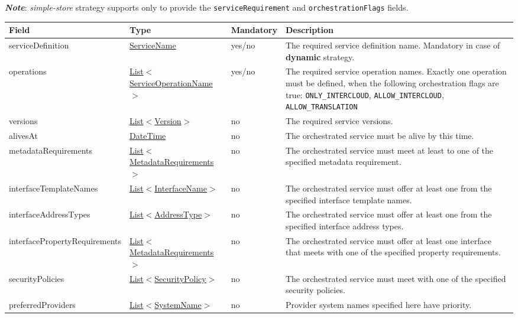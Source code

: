 \documentclass[a4paper]{arrowhead}
\newcommand{\pref}[1]{{\textcolor{ArrowheadGrey}{\hyperref[sec:model:primitives:#1]{#1}}}}
\begin{document}
\textbf{\textit{Note}}: \textit{simple-store} strategy supports only to provide the \texttt{serviceRequirement} and \texttt{orchestrationFlags} fields. 

\clearpage


\begin{table}[ht!]
\begin{tabularx}{\textwidth}{| p{4.8cm} | p{4.7cm} | p{2cm} | X |} \hline
\rowcolor{gray!33} Field & Type & Mandatory & Description \\ \hline
serviceDefinition & \pref{ServiceName} & yes/no & The required service definition name. Mandatory in case of \textbf{dynamic} strategy. \\ \hline
operations & \pref{List}$<$\pref{ServiceOperationName}$>$ & yes/no & The required service operation names. \newline 
Exactly one operation must be defined, when the following orchestration flags are true: \newline \texttt{ONLY\_INTERCLOUD}, \texttt{ALLOW\_INTERCLOUD}, \texttt{ALLOW\_TRANSLATION} \\ \hline
versions & \pref{List}$<$\pref{Version}$>$ & no & The required service versions. \\ \hline 
alivesAt & \pref{DateTime} & no & The orchestrated service must be alive by this time. \\ \hline
metadataRequirements & \pref{List}$<$\hyperref[sec:model:MetadataRequirements]{MetadataRequirements}$>$ & no & The orchestrated service must meet at least to one of the specified metadata requirement. \\ \hline
interfaceTemplateNames & \pref{List}$<$\pref{InterfaceName}$>$ & no & The orchestrated service must offer at least one from the specified interface template names. \\ \hline 
interfaceAddressTypes & \pref{List}$<$\pref{AddressType}$>$ & no & The orchestrated service must offer at least one from the specified interface address types. \\ \hline
interfacePropertyRequirements & \pref{List}$<$\hyperref[sec:model:MetadataRequirements]{MetadataRequirements}$>$ & no & The orchestrated service must offer at least one interface that meets with one of the specified property requirements. \\ \hline
securityPolicies & \pref{List}$<$\pref{SecurityPolicy}$>$ & no & The orchestrated service must meet with one of the specified security policies. \\ \hline
preferredProviders & \pref{List}$<$\pref{SystemName}$>$ & no & Provider system names specified here have priority. \\ \hline
\end{tabularx}
\end{table}
\end{document}
